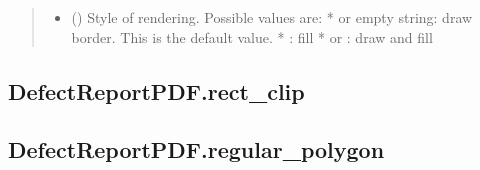 \documentclass[letterpaper,10pt,english]{sphinxmanual}
\begin{document}
\begin{fulllineitems}
\begin{fulllineitems}
\begin{quote}
\begin{description}
\begin{itemize}
\item {} 
\sphinxAtStartPar
{} () \textendash{} Style of rendering. Possible values are:
*  or empty string: draw border. This is the default value.
* : fill
*  or : draw and fill

\end{itemize}

\end{description}\end{quote}

\end{fulllineitems}



\subsection{DefectReportPDF.rect\_clip}
\label{\detokenize{generated/quality_assessment.quality_pdf_report.DefectReportPDF.rect_clip:defectreportpdf-rect-clip}}\label{\detokenize{generated/quality_assessment.quality_pdf_report.DefectReportPDF.rect_clip::doc}}

\begin{fulllineitems}
\label{\detokenize{generated/quality_assessment.quality_pdf_report.DefectReportPDF.rect_clip:quality_assessment.quality_pdf_report.DefectReportPDF.rect_clip}}
\end{fulllineitems}



\subsection{DefectReportPDF.regular\_polygon}
\label{\detokenize{generated/quality_assessment.quality_pdf_report.DefectReportPDF.regular_polygon:defectreportpdf-regular-polygon}}\label{\detokenize{generated/quality_assessment.quality_pdf_report.DefectReportPDF.regular_polygon::doc}}


\end{fulllineitems}
\end{document}
